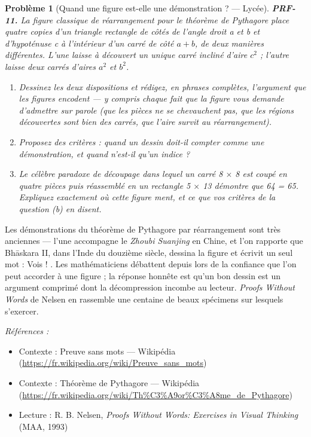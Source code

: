 \documentclass[11pt]{article}
\newtheorem{problem}{Problème}
\newenvironment{refs}{\par\small\noindent\emph{Références :}\begin{itemize}\setlength\itemsep{0pt}}{\end{itemize}\normalsize}
\begin{document}
\bigskip

\begin{problem}[{Quand une figure est-elle une démonstration ? --- Lycée}]
\textbf{PRF-11.} La figure classique de réarrangement pour le théorème de Pythagore
place quatre copies d'un triangle rectangle de côtés de l'angle droit a et b et d'hypoténuse
c à l'intérieur d'un carré de côté $ a + b $, de deux manières différentes. L'une laisse à
découvert un unique carré incliné d'aire $ c^2 $ ; l'autre laisse deux carrés d'aires
$ a^2 $ et $ b^2 $.
\begin{enumerate}
\item[(a)] Dessinez les deux dispositions et rédigez, en phrases complètes, l'argument que les
figures encodent --- y compris chaque fait que la figure vous demande d'admettre sur parole
(que les pièces ne se chevauchent pas, que les régions découvertes sont bien des carrés,
que l'aire survit au réarrangement).
\item[(b)] Proposez des critères : quand un dessin doit-il compter comme une démonstration, et
quand n'est-il qu'un indice ?
\item[(c)] Le célèbre paradoxe de découpage dans lequel un carré 8 $\times$ 8 est coupé en quatre pièces
puis réassemblé en un rectangle 5 $\times$ 13 \og{} démontre \fg{} que 64 = 65. Expliquez exactement où
cette figure ment, et ce que vos critères de la question (b) en disent.
\end{enumerate}

\end{problem}

\noindent Les démonstrations du théorème de Pythagore par réarrangement sont très
anciennes --- l'une accompagne le \textit{Zhoubi Suanjing} en Chine, et l'on rapporte que
Bh\=askara II, dans l'Inde du douzième siècle, dessina la figure et écrivit un seul mot :
\og{} Vois ! \fg{}. Les mathématiciens débattent depuis lors de la confiance que l'on peut accorder à
une figure ; la réponse honnête est qu'un bon dessin est un argument comprimé dont la
décompression incombe au lecteur. \textit{Proofs Without Words} de Nelsen en rassemble une
centaine de beaux spécimens sur lesquels s'exercer.

\begin{refs}
\item Contexte : Preuve sans mots --- Wikipédia (\url{https://fr.wikipedia.org/wiki/Preuve_sans_mots})
\item Contexte : Théorème de Pythagore --- Wikipédia (\url{https://fr.wikipedia.org/wiki/Th%C3%A9or%C3%A8me_de_Pythagore})
\item Lecture : R. B. Nelsen, \textit{Proofs Without Words: Exercises in Visual Thinking} (MAA, 1993)
\end{refs}
\end{document}
